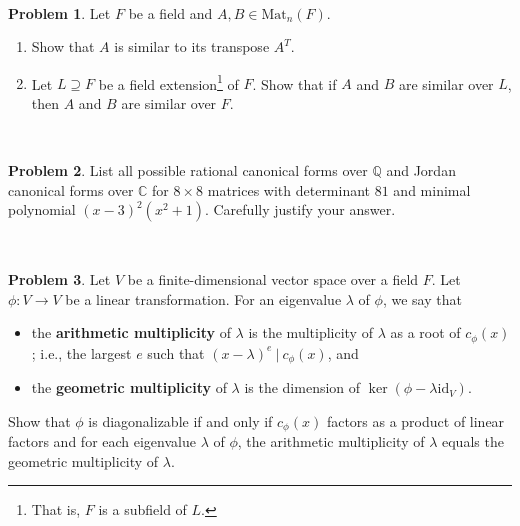 \documentclass[11pt]{article}
\newcommand{\C}{\mathbb{C}}
\newcommand{\Q}{\mathbb{Q}}
\theoremstyle{definition}
\newtheorem{problem}{Problem}
\begin{document}
\


\begin{problem}
Let $F$ be a field and $A,B\in \mathrm{Mat}_{n}(F)$.
\begin{enumerate}
\item[(a)] Show that $A$ is similar to its transpose $A^T$.
\item[(b)] Let $L\supseteq F$ be a field extension\footnote{That is, $F$ is a subfield of $L$.} of $F$. Show that if $A$ and $B$ are similar over $L$, then $A$ and $B$ are similar over $F$.
\end{enumerate}
\end{problem}



\

\begin{problem} List all possible rational canonical forms over $\Q$ and Jordan canonical forms over $\C$
for $8 \times 8$ matrices with determinant $81$ and minimal polynomial $(x-3)^2(x^2 + 1)$. Carefully justify your answer.
\end{problem}

\

\begin{problem} Let $V$ be a finite-dimensional vector space over a field $F$. Let $\phi:V\to V$ be a linear transformation. For an eigenvalue $\lambda$ of $\phi$, we say that
\begin{itemize}
\item the \textbf{arithmetic multiplicity} of $\lambda$ is the multiplicity of $\lambda$ as a root of $c_\phi(x)$; i.e., the largest $e$ such that $(x-\lambda)^e \ | \ c_\phi(x)$, and
\item the \textbf{geometric multiplicity} of $\lambda$ is the dimension of $\ker(\phi-\lambda \mathrm{id}_V)$.
\end{itemize}
Show that $\phi$ is diagonalizable if and only if $c_\phi(x)$ factors as a product of linear factors and for each eigenvalue $\lambda$ of $\phi$, the arithmetic multiplicity of $\lambda$ equals the geometric multiplicity of $\lambda$.
\end{problem}
\end{document}
